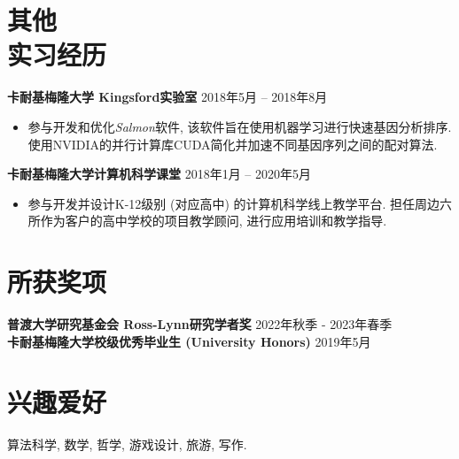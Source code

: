 \documentclass[margin, 10pt]{res-short} %
\begin{document}
\begin{resume}
\section{其他\\实习经历}
{\bf 卡耐基梅隆大学 Kingsford实验室} \hfill 2018年5月 -- 2018年8月
\begin{itemize}
\item 参与开发和优化{\it Salmon}软件, 该软件旨在使用机器学习进行快速基因分析排序. 使用NVIDIA的并行计算库CUDA简化并加速不同基因序列之间的配对算法. 
\end{itemize}

{\bf 卡耐基梅隆大学\;计算机科学课堂} \hfill 2018年1月 -- 2020年5月
\begin{itemize}
\item 参与开发并设计K-12级别 (对应高中) 的计算机科学线上教学平台. 担任周边六所作为客户的高中学校的项目教学顾问, 进行应用培训和教学指导. 
\end{itemize}



\section{所获奖项}
{\bf 普渡大学研究基金会 Ross-Lynn研究学者奖} \hfill 2022年秋季 - 2023年春季\\
{\bf 卡耐基梅隆大学校级优秀毕业生 (University Honors)} \hfill 2019年5月

\section{兴趣爱好} 算法科学, 数学, 哲学, 游戏设计, 旅游, 写作.


\end{resume}
\end{document}
